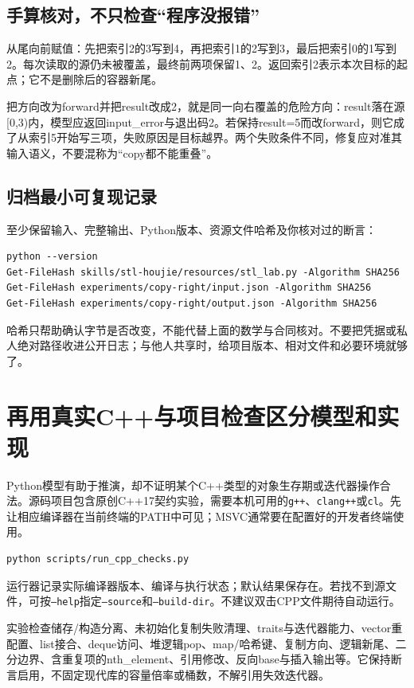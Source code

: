 \documentclass[11pt,a4paper,fontset=fandol]{ctexart}
\begin{document}
\subsection{手算核对，不只检查“程序没报错”}
从尾向前赋值：先把索引2的3写到4，再把索引1的2写到3，最后把索引0的1写到2。每次读取的源仍未被覆盖，最终前两项保留1、2。返回索引2表示本次目标的起点；它不是删除后的容器新尾。

把方向改为forward并把result改成2，就是同一向右覆盖的危险方向：result落在源[0,3)内，模型应返回input\_error与退出码2。若保持result=5而改forward，则它成了从索引5开始写三项，失败原因是目标越界。两个失败条件不同，修复应对准其输入语义，不要混称为“copy都不能重叠”。

\subsection{归档最小可复现记录}
至少保留输入、完整输出、Python版本、资源文件哈希及你核对过的断言：
\begin{lstlisting}
python --version
Get-FileHash skills/stl-houjie/resources/stl_lab.py -Algorithm SHA256
Get-FileHash experiments/copy-right/input.json -Algorithm SHA256
Get-FileHash experiments/copy-right/output.json -Algorithm SHA256
\end{lstlisting}
哈希只帮助确认字节是否改变，不能代替上面的数学与合同核对。不要把凭据或私人绝对路径收进公开日志；与他人共享时，给项目版本、相对文件和必要环境就够了。
\section{再用真实C++与项目检查区分模型和实现}
Python模型有助于推演，却不证明某个C++类型的对象生存期或迭代器操作合法。源码项目包含原创C++17契约实验，需要本机可用的\texttt{g++}、\texttt{clang++}或\texttt{cl}。先让相应编译器在当前终端的PATH中可见；MSVC通常要在配置好的开发者终端使用。
\begin{lstlisting}
python scripts/run_cpp_checks.py
\end{lstlisting}
运行器记录实际编译器版本、编译与执行状态；默认结果保存在。若找不到源文件，可按\texttt{--help}指定\texttt{--source}和\texttt{--build-dir}。不建议双击CPP文件期待自动运行。

实验检查储存/构造分离、未初始化复制失败清理、traits与迭代器能力、vector重配置、list接合、deque访问、堆逻辑pop、map/哈希键、复制方向、逻辑新尾、二分边界、含重复项的nth\_element、引用修改、反向base与插入输出等。它保持断言启用，不固定现代库的容量倍率或桶数，不解引用失效迭代器。
\end{document}
